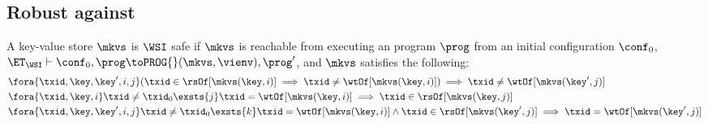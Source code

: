 

\subsection{Robust against \WSI}
\begin{definition}
    \label{def:wsi-safe}
    A key-value store \( \mkvs \) is \(\WSI\) safe if \( \mkvs \) is 
    reachable from executing an program \( \prog \) from an initial configuration \( \conf_0 \),
    \ie \( \ET_\WSI \vdash \conf_0, \prog \toPROG{} (\mkvs, \vienv), \prog' \),
    and \( \mkvs \) satisfies the following:
    \begin{align}
         & \fora{\txid,\key, \key',i,j} ( \txid \in \rsOf[\mkvs(\key,i)] \implies \txid \neq \wtOf[\mkvs(\key,i)] ) \implies \txid \neq \wtOf[\mkvs(\key',j)] \label{equ:wsi-safe-read-only} \\
         & \fora{\txid,\key,i} \txid \neq \txid_0 \exsts{j} \txid = \wtOf[\mkvs(\key,i)] \implies \txid \in \rsOf[\mkvs(\key,j)] \label{equ:wsi-safe-write-must-read} \\
         & \fora{\txid,\key,\key',i, j} \txid \neq \txid_0  \exsts{k} \txid = \wtOf[\mkvs(\key,i)] \land \txid \in \rsOf[\mkvs(\key',j)] \implies \txid = \wtOf[\mkvs(\key',j)] \label{equ:wsi-safe-all-write}
    \end{align}
\end{definition}


